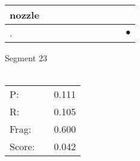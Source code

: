 \documentclass[landscape]{article}
\newcommand{\ssp}{\hspace{2pt}}
\newcommand{\mex}{\cellcolor{g}$\bullet$}
\begin{document}
\begin{tabular}{|l|p{10pt}|p{10pt}|p{10pt}|p{10pt}|p{10pt}|p{10pt}|p{10pt}|p{10pt}|p{10pt}|}
\hline
\ssp nozzle \ssp&\hspace{2pt}&\hspace{2pt}&\hspace{2pt}&\hspace{2pt}&\hspace{2pt}&\hspace{2pt}&\hspace{2pt}&\hspace{2pt}&\hspace{2pt}\\
\hline
\ssp \cellcolor{ref8}. \ssp&\hspace{2pt}&\hspace{2pt}&\hspace{2pt}&\hspace{2pt}&\hspace{2pt}&\hspace{2pt}&\hspace{2pt}&\hspace{2pt}&\hspace{2pt}\mex\\
\hline
\end{tabular}

\vspace{6pt}
\noindent Segment 23\\\\
\noindent\begin{tabular}{lm{12pt}r}
\hline
P:&&0.111\\
R:&&0.105\\
Frag:&&0.600\\
Score:&&0.042\\
\end{tabular}

\newpage
\end{document}
